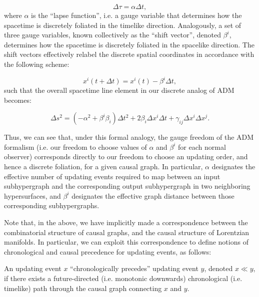 \documentclass{article}
\begin{document}
\begin{equation}
\Delta \tau = \alpha \Delta t,
\end{equation}
where ${\alpha}$ is the ``lapse function'', i.e. a gauge variable that determines how the spacetime is discretely foliated in the timelike direction. Analogously, a set of three gauge variables, known collectively as the ``shift vector'', denoted ${\beta^i}$, determines how the spacetime is discretely foliated in the spacelike direction. The shift vectors effectively relabel the discrete spatial coordinates in accordance with the following scheme:

\begin{equation}
x^i \left( t + \Delta t \right) = x^i \left( t \right) - \beta^i \Delta t,
\end{equation}
such that the overall spacetime line element in our discrete analog of ADM becomes:

\begin{equation}
\Delta s^2 = \left( - \alpha^2 + \beta^i \beta_i \right) \Delta t^2 + 2 \beta_i \Delta x^i \Delta t + \gamma_{i j} \Delta x^i \Delta x^j.
\end{equation}

Thus, we can see that, under this formal analogy, the gauge freedom of the ADM formalism (i.e. our freedom to choose values of ${\alpha}$ and ${\beta^i}$ for each normal observer) corresponds directly to our freedom to choose an updating order, and hence a discrete foliation, for a given causal graph. In particular, ${\alpha}$ designates the effective number of updating events required to map between an input subhypergraph and the corresponding output subhypergraph in two neighboring hypersurfaces, and ${\beta^i}$ designates the effective graph distance between those corresponding subhypergraphs.

Note that, in the above, we have implicitly made a correspondence between the combinatorial structure of causal graphs, and the causal structure of Lorentzian manifolds\cite{penrose}\cite{levichev}\cite{malament}. In particular, we can exploit this correspondence to define notions of chronological and causal precedence for updating events, as follows:

\begin{definition}
An updating event $x$ ``chronologically precedes'' updating event $y$, denoted ${x \ll y}$, if there exists a future-directed (i.e. monotonic downwards) chronological (i.e. timelike) path through the causal graph connecting $x$ and $y$.
\end{definition}
\end{document}
